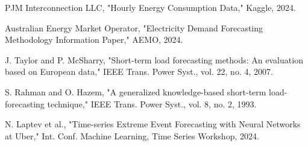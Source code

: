 \documentclass[12pt,a4paper]{report}
\begin{document}
\begin{thebibliography}{99}
 PJM Interconnection LLC, "Hourly Energy Consumption Data," Kaggle, 2024.

 Australian Energy Market Operator, "Electricity Demand Forecasting Methodology Information Paper," AEMO, 2024.

 J. Taylor and P. McSharry, "Short-term load forecasting methods: An evaluation based on European data," IEEE Trans. Power Syst., vol. 22, no. 4, 2007.

 S. Rahman and O. Hazem, "A generalized knowledge-based short-term load-forecasting technique," IEEE Trans. Power Syst., vol. 8, no. 2, 1993.

 N. Laptev et al., "Time-series Extreme Event Forecasting with Neural Networks at Uber," Int. Conf. Machine Learning, Time Series Workshop, 2024.

\end{thebibliography}
\end{document}
